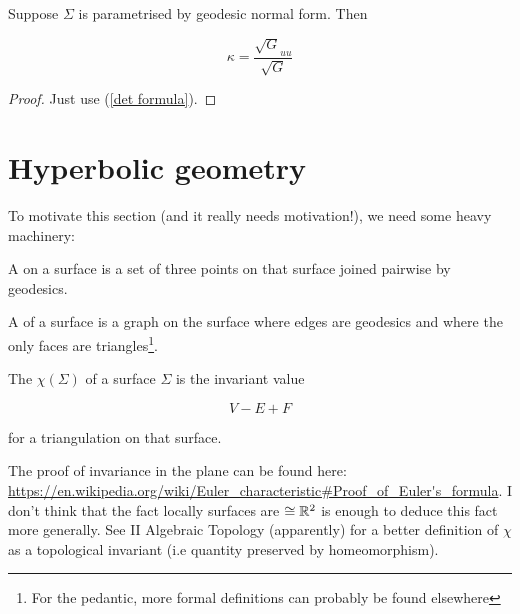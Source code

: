 \documentclass[11pt]{scrartcl}
\begin{document}
\begin{proposition}

Suppose $\Sigma$ is parametrised by geodesic normal form. Then

\begin{equation}
    \kappa = \frac{\sqrt{G}_{uu}}{\sqrt{G}}
\end{equation}

\begin{proof}
    Just use (\ref{det formula}).
\end{proof}
\end{proposition}

\section{Hyperbolic geometry}

To motivate this section (and it really needs motivation!), we need some heavy machinery:

\begin{definition}

A  on a surface is a set of three points on that surface joined pairwise by geodesics.
\end{definition}

\begin{definition}
[Triangulation]

A  of a surface is a graph on the surface where edges are geodesics and where the only faces are triangles\footnote{For the pedantic, more formal definitions can probably be found elsewhere}.
\end{definition}

\begin{definition}
The  $\chi(\Sigma)$ of a surface $\Sigma$ is the invariant value

\begin{equation}
    V - E + F
\end{equation}

for a triangulation on that surface.
\end{definition}

The proof of invariance in the plane can be found here: \url{https://en.wikipedia.org/wiki/Euler_characteristic#Proof_of_Euler's_formula}. I don't think that the fact locally surfaces are $\cong \mathbb R^2$ is enough to deduce this fact more generally. See II Algebraic Topology (apparently) for a better definition of $\chi$ as a topological invariant (i.e quantity preserved by homeomorphism).
\end{document}

